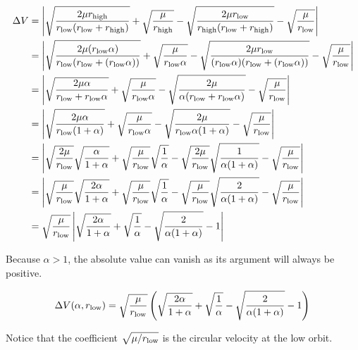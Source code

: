 \documentclass[../basicOrbitalDynamics.tex]{subfiles}
\begin{document}
\begin{align*}
    \Delta V &= \left|\sqrt{\frac{2\mu{}{r}_\text{high}}{{r}_\text{low}({r}_\text{low}+{r}_\text{high})}}+\sqrt{\frac{\mu}{{r}_\text{high}}}-\sqrt{\frac{2\mu{}{r}_\text{low}}{{r}_\text{high}({r}_\text{low}+{r}_\text{high})}}-\sqrt{\frac{\mu}{{r}_\text{low}}}\right|\\
    &= \left|\sqrt{\frac{2\mu{}({r}_\text{low}\alpha)}{{r}_\text{low}({r}_\text{low}+({r}_\text{low}\alpha))}}+\sqrt{\frac{\mu}{{r}_\text{low}\alpha}}-\sqrt{\frac{2\mu{}{r}_\text{low}}{({r}_\text{low}\alpha)({r}_\text{low}+({r}_\text{low}\alpha))}}-\sqrt{\frac{\mu}{{r}_\text{low}}}\right| \\
    &= \left|\sqrt{\frac{2\mu\alpha}{{r}_\text{low}+{r}_\text{low}\alpha}}+\sqrt{\frac{\mu}{{r}_\text{low}\alpha}}-\sqrt{\frac{2\mu}{\alpha({r}_\text{low}+{r}_\text{low}\alpha)}}-\sqrt{\frac{\mu}{{r}_\text{low}}}\right| \\
    &= \left|\sqrt{\frac{2\mu\alpha}{{r}_\text{low}(1+\alpha)}}+\sqrt{\frac{\mu}{{r}_\text{low}\alpha}}-\sqrt{\frac{2\mu}{{r}_\text{low}\alpha(1+\alpha)}}-\sqrt{\frac{\mu}{{r}_\text{low}}}\right| \\
    &= \left|\sqrt{\frac{2\mu}{{r}_\text{low}}}\sqrt{\frac{\alpha}{1+\alpha}}+\sqrt{\frac{\mu}{{r}_\text{low}}}\sqrt{\frac{1}{\alpha}}-\sqrt{\frac{2\mu}{{r}_\text{low}}}\sqrt{\frac{1}{\alpha(1+\alpha)}}-\sqrt{\frac{\mu}{{r}_\text{low}}}\right| \\
    &= \left|\sqrt{\frac{\mu}{{r}_\text{low}}}\sqrt{\frac{2\alpha}{1+\alpha}}+\sqrt{\frac{\mu}{{r}_\text{low}}}\sqrt{\frac{1}{\alpha}}-\sqrt{\frac{\mu}{{r}_\text{low}}}\sqrt{\frac{2}{\alpha(1+\alpha)}}-\sqrt{\frac{\mu}{{r}_\text{low}}}\right| \\
    &= \sqrt{\frac{\mu}{{r}_\text{low}}}\left|\sqrt{\frac{2\alpha}{1+\alpha}}+\sqrt{\frac{1}{\alpha}}-\sqrt{\frac{2}{\alpha(1+\alpha)}}-1\right| \\
\end{align*}

Because $\alpha>1$, the absolute value can vanish as its argument will always be positive.

\begin{equation}\label{Delta V in terms of Alpha Hohmann}
    \Delta V(\alpha, {r}_\text{low}) = \sqrt{\frac{\mu}{{r}_\text{low}}}\left(\sqrt{\frac{2\alpha}{1+\alpha}}+\sqrt{\frac{1}{\alpha}}-\sqrt{\frac{2}{\alpha(1+\alpha)}}-1\right)\\
\end{equation}

Notice that the coefficient $\sqrt{\mu/{r}_\text{low}}$ is the circular velocity at the low orbit.
\end{document}
